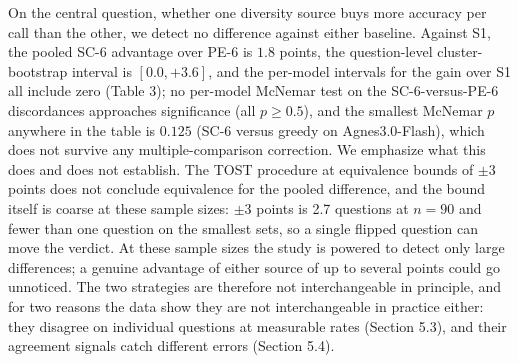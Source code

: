 \documentclass[preprint,12pt]{elsarticle}
\begin{document}
On the central question, whether one diversity source buys more accuracy per call than the other, we detect no difference against either baseline. Against S1, the pooled SC-6 advantage over PE-6 is $1.8$ points, the question-level cluster-bootstrap interval is $[0.0, +3.6]$, and the per-model intervals for the gain over S1 all include zero (Table 3); no per-model McNemar test on the SC-6-versus-PE-6 discordances approaches significance (all $p \ge 0.5$), and the smallest McNemar $p$ anywhere in the table is $0.125$ (SC-6 versus greedy on Agnes3.0-Flash), which does not survive any multiple-comparison correction. We emphasize what this does and does not establish. The TOST procedure at equivalence bounds of $\pm 3$ points does not conclude equivalence for the pooled difference, and the bound itself is coarse at these sample sizes: $\pm 3$ points is 2.7 questions at $n = 90$ and fewer than one question on the smallest sets, so a single flipped question can move the verdict. At these sample sizes the study is powered to detect only large differences; a genuine advantage of either source of up to several points could go unnoticed. The two strategies are therefore not interchangeable in principle, and for two reasons the data show they are not interchangeable in practice either: they disagree on individual questions at measurable rates (Section 5.3), and their agreement signals catch different errors (Section 5.4).
\end{document}
